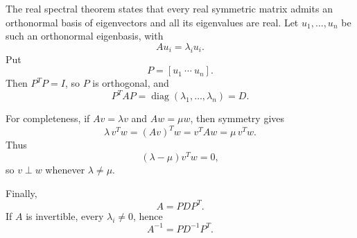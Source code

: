 \begin{solution}
The real spectral theorem states that every real symmetric matrix admits an orthonormal basis
of eigenvectors and all its eigenvalues are real. Let \(u_1,\dots,u_n\) be such an orthonormal
eigenbasis, with
\[
Au_i=\lambda_i u_i.
\]
Put
\[
P=[u_1\ \cdots\ u_n].
\]
Then \(P^TP=I\), so \(P\) is orthogonal, and
\[
P^TAP=\operatorname{diag}(\lambda_1,\dots,\lambda_n)=D.
\]

For completeness, if \(Av=\lambda v\) and \(Aw=\mu w\), then symmetry gives
\[
\lambda\,v^Tw=(Av)^Tw=v^TAw=\mu\,v^Tw.
\]
Thus
\[
(\lambda-\mu)v^Tw=0,
\]
so \(v\perp w\) whenever \(\lambda\ne\mu\).

Finally,
\[
A=PDP^T.
\]
If \(A\) is invertible, every \(\lambda_i\ne0\), hence
\[
A^{-1}=PD^{-1}P^T.
\]
\end{solution}

